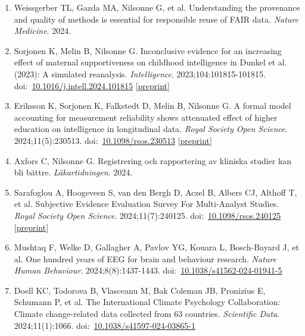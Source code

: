 \documentclass[10pt,a4paper,twocolumn]{article}
\begin{document}
\begin{enumerate}
    \item Weissgerber TL, Gazda MA, Nilsonne G, et al. Understanding the provenance and quality of methods is essential for responsible reuse of FAIR data. \textit{Nature Medicine}. 2024.

    \item Sorjonen K, Melin B, Nilsonne G. Inconclusive evidence for an increasing effect of maternal supportiveness on childhood intelligence in Dunkel et al. (2023): A simulated reanalysis. \textit{Intelligence}. 2023;104:101815-101815. doi:~\href{https://doi.org/10.1016/j.intell.2024.101815}{10.1016/j.intell.2024.101815} [\href{https://doi.org/10.31234/osf.io/945hb}{preprint}]

    \item Eriksson K, Sorjonen K, Falkstedt D, Melin B, Nilsonne G. A formal model accounting for measurement reliability shows attenuated effect of higher education on intelligence in longitudinal data. \textit{Royal Society Open Science}. 2024;11(5):230513. doi:~\href{https://doi.org/10.1098/rsos.230513}{10.1098/rsos.230513} [\href{https://doi.org/10.31234/osf.io/xajz8}{preprint}]

    \item Axfors C, Nilsonne G. Registrering och rapportering av kliniska studier kan bli bättre. \textit{Läkartidningen}. 2024.

    \item Sarafoglou A, Hoogeveen S, van den Bergh D, Aczel B, Albers CJ, Althoff T, et al. Subjective Evidence Evaluation Survey For Multi-Analyst Studies. \textit{Royal Society Open Science}. 2024;11(7):240125. doi:~\href{https://doi.org/10.1098/rsos.240125}{10.1098/rsos.240125} [\href{https://doi.org/10.31234/osf.io/mxje3}{preprint}]

    \item Mushtaq F, Welke D, Gallagher A, Pavlov YG, Kouara L, Bosch-Bayard J, et al. One hundred years of EEG for brain and behaviour research. \textit{Nature Human Behaviour}. 2024;8(8):1437-1443. doi:~\href{https://doi.org/10.1038/s41562-024-01941-5}{10.1038/s41562-024-01941-5}

    \item Doell KC, Todorova B, Vlasceanu M, Bak Coleman JB, Pronizius E, Schumann P, et al. The International Climate Psychology Collaboration: Climate change-related data collected from 63 countries. \textit{Scientific Data}. 2024;11(1):1066. doi:~\href{https://doi.org/10.1038/s41597-024-03865-1}{10.1038/s41597-024-03865-1}


\end{enumerate}
\end{document}
